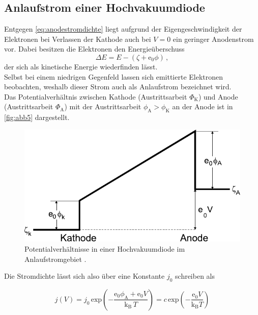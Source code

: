 \subsection{Anlaufstrom einer Hochvakuumdiode}

Entgegen \eqref{eq:anodestromdichte} liegt aufgrund der Eigengeschwindigkeit der Elektronen bei Verlassen
der Kathode auch bei $V = 0$ ein geringer Anodenstrom vor.
Dabei besitzen die Elektronen den Energieüberschuss
\begin{equation*}
    \Delta E = E - (\zeta + \text{e}_0 \phi) \,,
\end{equation*}
der sich als kinetische Energie wiederfinden lässt. \\

Selbst bei einem niedrigen Gegenfeld lassen sich emittierte Elektronen beobachten,
weshalb dieser Strom auch als Anlaufstrom bezeichnet wird. \\

Das Potentialverhältnis zwischen Kathode (Austrittsarbeit $\Phi_\text{K}$) und Anode (Austrittsarbeit $\Phi_\text{A}$) mit der
Austrittsarbeit $\phi_\text{A} > \phi_\text{K}$ an der Anode
ist in \autoref{fig:abb5} dargestellt.

\begin{figure}[H]
    \centering
    \includegraphics{figures/Abb5.pdf}
    \caption{Potentialverhältnisse in einer Hochvakuumdiode im Anlaufstromgebiet \cite{ap09}.}
    \label{fig:abb5}
\end{figure}

Die Stromdichte lässt sich also über eine Konstante $j_0$ schreiben als

\begin{equation}
    j(V) = j_0 \, \text{exp}\left(-\dfrac{\text{e}_0 \phi_\text{A} + \text{e}_0 V}{\text{k}_\text{B} \, T} \right)
         = c \,\text{exp}\left(-\dfrac{\text{e}_0 V}{\text{k}_\text{B} T} \right)
         \label{eq:stromladexp}
\end{equation}


